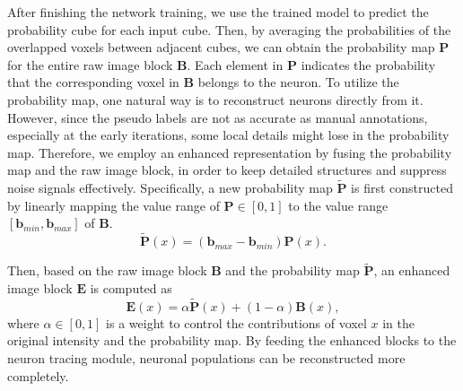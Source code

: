 After finishing the network training, we use the trained model to predict the probability cube for each input cube.
Then, by averaging the probabilities of the overlapped voxels between adjacent cubes, we can obtain the probability map $\mathbf{P}$ for the entire raw image block $ \mathbf{B} $.
Each element in $\mathbf{P}$ indicates the probability that the corresponding voxel in $ \mathbf{B} $ belongs to the neuron.
To utilize the probability map, one natural way is to reconstruct neurons directly from it.
However, since the pseudo labels are not as accurate as manual annotations, 
especially at the early iterations, some local details might lose in the probability map. Therefore, we employ an enhanced representation by fusing the probability map and the raw image block, in order to keep detailed structures and suppress noise signals effectively.
Specifically, a new probability map $\widetilde{\mathbf{P}} $ is first constructed by linearly mapping the value range of $ \mathbf{P}\in [0,1] $ to the value range $[\mathbf{b}_{min}, \mathbf{b}_{max}]$ of $\mathbf{B}$.
\begin{equation}
\widetilde{\mathbf{P}}(x) = (\mathbf{b}_{max}-\mathbf{b}_{min})\mathbf{P}(x).
\end{equation}


Then, based on the raw image block $\mathbf{B}$ and the probability map $\widetilde{\mathbf{P}}$, an enhanced image block $\mathbf{E}$ is computed as
\begin{equation}
\mathbf{E}(x) = \alpha\widetilde{\mathbf{P}}(x) + (1-\alpha)\mathbf{B}(x),
\label{equ: enhance}
\end{equation}
where $\alpha\in [0,1]$ is a weight to control the contributions of voxel $ x $ in the original intensity and the probability map. By feeding the enhanced blocks to the neuron tracing module, neuronal populations can be reconstructed more completely.


